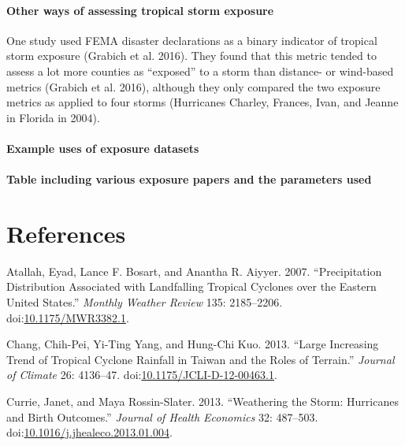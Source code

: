 \documentclass[]{elsarticle} %
\begin{document}
\paragraph{Other ways of assessing tropical storm
exposure}\label{other-ways-of-assessing-tropical-storm-exposure}

One study used FEMA disaster declarations as a binary indicator of
tropical storm exposure (Grabich et al. 2016). They found that this
metric tended to assess a lot more counties as ``exposed'' to a storm
than distance- or wind-based metrics (Grabich et al. 2016), although
they only compared the two exposure metrics as applied to four storms
(Hurricanes Charley, Frances, Ivan, and Jeanne in Florida in 2004).

\paragraph{Example uses of exposure
datasets}\label{example-uses-of-exposure-datasets}

\paragraph{Table including various exposure papers and the parameters
used}\label{table-including-various-exposure-papers-and-the-parameters-used}

\section*{References}\label{references}

\hypertarget{refs}{}
\hypertarget{ref-Atallah2007}{}
Atallah, Eyad, Lance F. Bosart, and Anantha R. Aiyyer. 2007.
``Precipitation Distribution Associated with Landfalling Tropical
Cyclones over the Eastern United States.'' \emph{Monthly Weather Review}
135: 2185--2206.
doi:\href{https://doi.org/10.1175/MWR3382.1}{10.1175/MWR3382.1}.

\hypertarget{ref-Chang2013}{}
Chang, Chih-Pei, Yi-Ting Yang, and Hung-Chi Kuo. 2013. ``Large
Increasing Trend of Tropical Cyclone Rainfall in Taiwan and the Roles of
Terrain.'' \emph{Journal of Climate} 26: 4136--47.
doi:\href{https://doi.org/10.1175/JCLI-D-12-00463.1}{10.1175/JCLI-D-12-00463.1}.

\hypertarget{ref-Currie2013}{}
Currie, Janet, and Maya Rossin-Slater. 2013. ``Weathering the Storm:
Hurricanes and Birth Outcomes.'' \emph{Journal of Health Economics} 32:
487--503.
doi:\href{https://doi.org/10.1016/j.jhealeco.2013.01.004}{10.1016/j.jhealeco.2013.01.004}.
\end{document}
